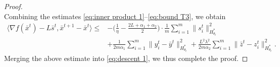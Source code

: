 \documentclass{article}
\theoremstyle{plain}
\theoremstyle{definition}
\theoremstyle{remark}
\newcommand{\sL}{L}
\begin{document}
\begin{proof}
\begin{equation}
    \end{equation}
   Combining the estimates \eqref{eq:inner product 1}--\eqref{eq:bound T3}, we obtain
   \begin{equation*} \begin{aligned}
        \langle \nabla f(\bar x^t) - \sL \bar s^t, \bar x^{t+1} - \bar x^t \rangle
       \leq &-\Big(\frac{1}{\eta}-\frac{2\sL+\alpha_1+\alpha_2}{2}\Big)\cdot \frac{1}{m}{\sum}_{i=1}^m\|s^t_i\|_{H_{\theta_t}^*}^2 \\&+ \frac{1}{2m \alpha_1} {\sum}_{i=1}^m\|y_i^t - \bar y^t\|^2_{H_{\theta_t}^*} + \frac{\sL^2\lambda^2}{2m\alpha_2} {\sum}_{i=1}^m \|\bar z^t - z_i^t\|_{H_{\theta_t}^*}^2.
   \end{aligned} \end{equation*}
Merging the above estimate into \eqref{eq:descent 1}, we thus complete the proof.
\end{proof}
\end{document}
